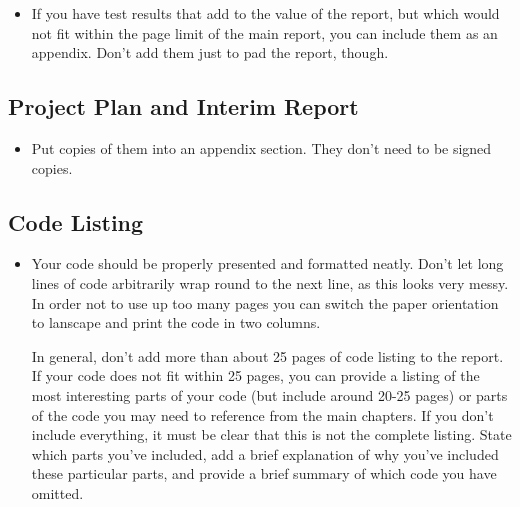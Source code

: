 \begin{framed}
	\begin{itemize}
		\item If you have test results that add to the value of the report, but which would not fit within the page limit of the main report, you can include them as an appendix. Don't add them just to pad the report, though.
	\end{itemize}
\end{framed}

\subsection{Project Plan and Interim Report}

\begin{framed}
	\begin{itemize}
		\item Put copies of them into an appendix section. They don't need to be signed copies.
	\end{itemize}
\end{framed}

\subsection{Code Listing}

\begin{framed}
	\begin{itemize}
		\item Your code should be properly presented and formatted neatly. Don't let long lines of code arbitrarily wrap round to the next line, as this looks very messy. In order not to use up too many pages you can switch the paper orientation to lanscape and print the code in two columns.

		In general, don't add more than about 25 pages of code listing to the report. If your code does not fit within 25 pages, you can provide a listing of the most interesting parts of your code (but include around 20-25 pages) or parts of the code you may need to reference from the main chapters. If you don't include everything, it must be clear that this is not the complete listing. State which parts you've included, add a brief explanation of why you've included these particular parts, and provide a brief summary of which code you have omitted.
	\end{itemize}
\end{framed}
